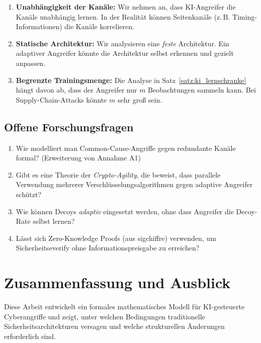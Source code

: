 \documentclass[a4paper,12pt]{article}
\theoremstyle{definition}
\begin{document}
\begin{enumerate}
	\item \textbf{Unabhängigkeit der Kanäle:} Wir nehmen an, dass KI-Angreifer die Kanäle unabhängig lernen. In der Realität können Seitenkanäle (z.\,B. Timing-Informationen) die Kanäle korrelieren.
	
	\item \textbf{Statische Architektur:} Wir analysieren eine \emph{feste} Architektur. Ein adaptiver Angreifer könnte die Architektur selbst erkennen und gezielt anpassen.
	
	\item \textbf{Begrenzte Trainingsmenge:} Die Analyse in Satz~\ref{satz:ki_lernschranke} hängt davon ab, dass der Angreifer nur $m$ Beobachtungen sammeln kann. Bei Supply-Chain-Attacks könnte $m$ sehr groß sein.
\end{enumerate}

\subsection{Offene Forschungsfragen}

\begin{enumerate}
	\item Wie modelliert man Common-Cause-Angriffe gegen redundante Kanäle formal? (Erweiterung von Annahme A1)
	
	\item Gibt es eine Theorie der \emph{Crypto-Agility}, die beweist, dass parallele Verwendung mehrerer Verschlüsselungsalgorithmen gegen adaptive Angreifer schützt?
	
	\item Wie können Decoys \emph{adaptiv} eingesetzt werden, ohne dass Angreifer die Decoy-Rate selbst lernen?
	
	\item Lässt sich Zero-Knowledge Proofs (aus sigchiffre) verwenden, um Sicherheitseverify ohne Informationspreisgabe zu erreichen?
\end{enumerate}

\section{Zusammenfassung und Ausblick}

Diese Arbeit entwickelt ein formales mathematisches Modell für KI-gesteuerte Cyberangriffe und zeigt, unter welchen Bedingungen traditionelle Sicherheitsarchitekturen versagen und welche strukturellen Änderungen erforderlich sind.
\end{document}
